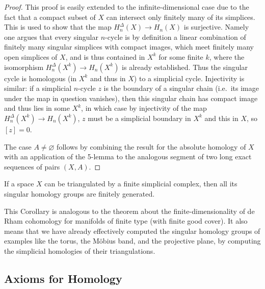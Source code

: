 \documentclass[english,letterpaper]{article}%
\numberwithin{equation}{section}
\numberwithin{figure}{section}
\numberwithin{table}{section}
\theoremstyle{definition}
\theoremstyle{definition}
\theoremstyle{definition}
\theoremstyle{plain}
\theoremstyle{plain}
\theoremstyle{plain}
\theoremstyle{plain}
\theoremstyle{remark}
\theoremstyle{remark}
\def\red{\color{red}}
\newcommand{\PRLsep}{   %
           \noindent\makebox[\linewidth]{
                \resizebox{0.5\linewidth}{1pt}{$\blacklozenge$}}}
\begin{document}
\begin{proof}
    This proof is easily extended to the infinite-dimensional case due to the fact that a compact subset of $X$ can intersect only finitely many of its simplices. This is used to show that the map $H^\Delta_n(X)\to H_n(X)$ is surjective. Namely one argues that every singular $n$-cycle is by definition a linear combination of finitely many singular simplices with compact images, which meet finitely many open simplices of $X$, and is thus contained in $X^k$ for some finite $k$, where the isomorphism $H^\Delta_n(X^k)\to H_n(X^k)$ is already established. Thus the singular cycle is homologous (in $X^k$ and thus in $X$) to a simplicial cycle. Injectivity is similar: if a simplicial $n$-cycle $z$ is the boundary of a singular chain (i.e.\ its image under the map in question vanishes), then this singular chain has compact image and thus lies in some $X^k$, in which case by injectivity of the map $H^\Delta_n(X^k)\to H_n(X^k)$, $z$ must be a simplicial boundary in $X^k$ and this in $X$, so $[z]=0$. 
    
    The case $A\neq\varnothing$ follows by combining the result for the absolute homology of $X$ with an application of the 5-lemma to the analogous segment of two long exact sequences of pairs $(X,A)$.
\end{proof}

\begin{cor}
    If a space $X$ can be triangulated by a finite simplicial complex, then all its singular homology groups are finitely generated.
\end{cor}

This Corollary is analogous to the theorem about the finite-dimensionality of de Rham cohomology for manifolds of finite type (with finite good cover). It also means that we have already effectively computed the singular homology groups of examples like the torus, the M\"obius band, and the projective plane, by computing the simplicial homologies of their triangulations.

\subsection{Axioms for Homology}
\end{document}

